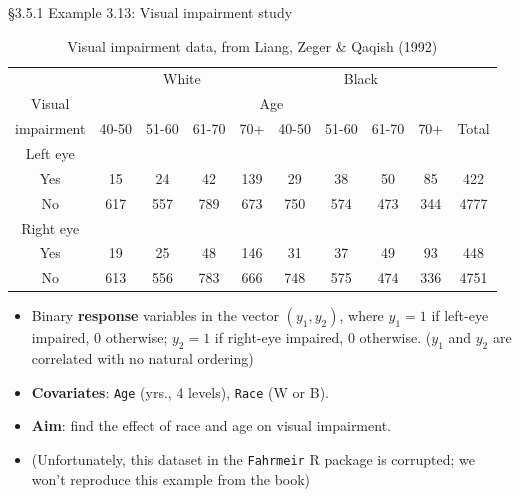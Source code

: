 \documentclass{beamer}
\begin{document}






\begin{frame}{\S3.5.1 Example 3.13: Visual impairment study}
\begin{table} [!htbp]
\caption{Visual impairment data, from Liang, Zeger \& Qaqish (1992) \label{tab1.3}}
\begin{center}
\begin{scriptsize}
\begin{tabular}{|c|cccc|cccc|c|}
\hline
& \multicolumn{4}{c}{White} & \multicolumn{4}{c|}{Black} & \\
Visual &\multicolumn{8}{c|}{Age} & \\
impairment & 40-50 & 51-60 & 61-70 & 70+ & 40-50
 & 51-60 & 61-70 & 70+ & Total \\ \hline
Left eye & &&&&&&&& \\
Yes & 15 & 24 & 42 & 139 & 29 & 38 & 50 & 85 & 422 \\
No & 617 & 557 & 789 & 673 & 750 & 574 & 473 & 344 & 4777 \\ \hline
Right eye & &&&&&&&& \\
Yes & 19 & 25 & 48 & 146 & 31 & 37 & 49 & 93 & 448 \\
No & 613 & 556 & 783 & 666 & 748 & 575 & 474 & 336 & 4751 \\ \hline
\end{tabular}
\end{scriptsize}
\end{center}
\end{table}
\begin{itemize}
\item
Binary \textbf{response} variables in the vector $(y_1, y_2)$, where $y_1=1$ if left-eye impaired, 0 otherwise;
 $y_2=1$ if right-eye impaired, 0 otherwise. ($y_1$ and $y_2$ are correlated with no natural ordering)
\item
\textbf{Covariates}: \texttt{Age} (yrs., 4 levels), \texttt{Race} (W or B).
\item
\textbf{Aim}: find the effect of race and age on visual impairment.
\item (Unfortunately, this dataset in the \texttt{Fahrmeir} R package is corrupted; we won't  reproduce this example from the book)
\end{itemize}
\end{frame}
\end{document}
